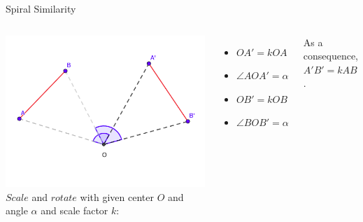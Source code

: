 \documentclass{beamer}
\begin{document}
\begin{frame}{Spiral Similarity}
	\begin{columns}
		\includegraphics[scale=0.4]{spi1.png}
		$Scale$ and $rotate$ with given center $O$ and angle
		$\alpha$ and scale factor $k$:
		\begin{itemize}
			\item $OA' = kOA$
			\item $\angle AOA' = \alpha$
			\item $OB' = kOB$
			\item $\angle BOB' = \alpha$
		\end{itemize}
		As a consequence, $A'B' = kAB$.
	\end{columns}
\end{frame}
\end{document}
